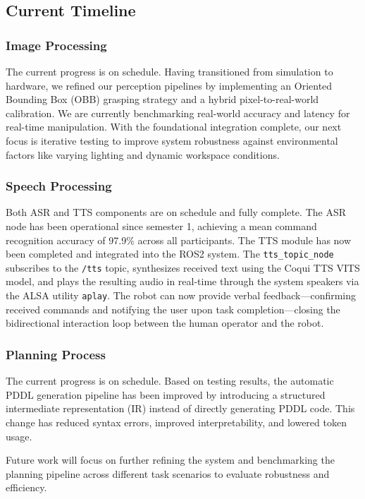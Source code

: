 \documentclass[12pt]{extarticle}
\begin{document}
\subsection{Current Timeline}

\subsubsection{Image Processing}
The current progress is on schedule. Having transitioned from simulation to hardware, we refined our perception pipelines by implementing an Oriented Bounding Box (OBB) grasping strategy and a hybrid pixel-to-real-world calibration. We are currently benchmarking real-world accuracy and latency for real-time manipulation. With the foundational integration complete, our next focus is iterative testing to improve system robustness against environmental factors like varying lighting and dynamic workspace conditions.

\subsubsection{Speech Processing}

Both ASR and TTS components are on schedule and fully complete. The ASR node has been operational since semester 1, achieving a mean command recognition accuracy of 97.9\% across all participants. The TTS module has now been completed and integrated into the ROS2 system. The \texttt{tts\_topic\_node} subscribes to the \texttt{/tts} topic, synthesizes received text using the Coqui TTS VITS model, and plays the resulting audio in real-time through the system speakers via the ALSA utility \texttt{aplay}. The robot can now provide verbal feedback—confirming received commands and notifying the user upon task completion—closing the bidirectional interaction loop between the human operator and the robot.

\subsubsection{Planning Process}
The current progress is on schedule. Based on testing results, the automatic PDDL generation pipeline has been improved by introducing a structured intermediate representation (IR) instead of directly generating PDDL code. This change has reduced syntax errors, improved interpretability, and lowered token usage.

Future work will focus on further refining the system and benchmarking the planning pipeline across different task scenarios to evaluate robustness and efficiency.
\end{document}
